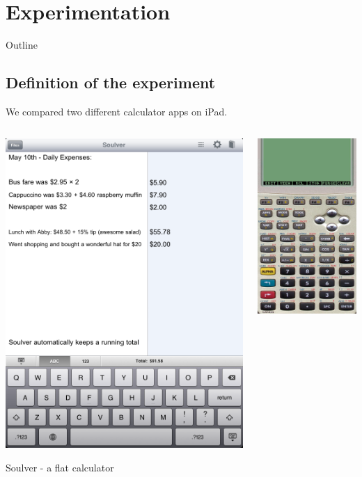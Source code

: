 \documentclass{beamer}
\begin{document}
\section{Experimentation}

\begin{frame}{Outline}

	\tableofcontents[currentsection]

\end{frame}

\subsection{Definition of the experiment}
\begin{frame}
We compared two different calculator apps on iPad.

\begin{columns}[c]
    \begin{center}
    \includegraphics[height=.75\textwidth]{soulver_screenshot.png}
    
    Soulver - a flat calculator
    \end{center}
	\begin{center}
    \includegraphics[height=.75\textwidth]{m48p_screenshot.jpeg}
    

\end{center}
\end{columns}
\end{frame}
\end{document}
